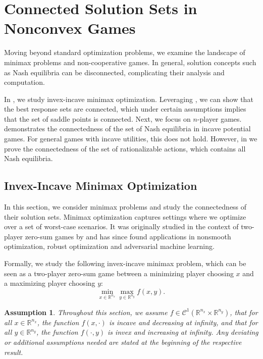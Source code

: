 \documentclass{article}
\newtheorem{assum}{Assumption}
\newcommand{\R}{\mathbb{R}}
\begin{document}
\section{Connected Solution Sets in Nonconvex Games}
\label{sec:connected_equilibria}





Moving beyond standard optimization problems, we examine the landscape of minimax problems and non-cooperative games. In general, solution concepts such as Nash equilibria can be disconnected, complicating their analysis and computation.


In , we study invex-incave minimax optimization. Leveraging , we can show that the best response sets are connected, which under certain assumptions implies that the set of saddle points is connected. Next, we focus on $n$-player games.  demonstrates the connectedness of the set of Nash equilibria in incave potential games. For general games with incave utilities, this does not hold. However, in  we prove the connectedness of the set of rationalizable actions, which contains all Nash equilibria. 



\subsection{Invex-Incave Minimax Optimization}
\label{sec:zero_sum_games}

In this section, we consider minimax problems and study the connectedness of their solution sets. Minimax optimization captures settings where we optimize over a set of worst-case scenarios. It was originally studied in the context of two-player zero-sum games by \citet{Neumann1928Zur} and has since found applications in nonsmooth optimization, robust optimization and adversarial machine learning. 

Formally, we study the following invex-incave minimax problem, which can be seen as a two-player zero-sum game between a minimizing player choosing $x$ and a maximizing player choosing $y$:
\begin{equation}
    \label{eq:minimax_problem}
    \min_{x\in \R^{n_x}} \max_{y\in \R^{n_y}} f(x,y).
\end{equation}

\begin{assum}
    \label{assum:minmaxinvex}
    Throughout this section, we assume $f \in \mathcal{C}^1(\R^{n_x} \times \R^{n_y})$, that for all $x \in \R^{n_x}$, the function $f(x,\cdot)$ is incave and decreasing at infinity, and that for all $y \in \R^{n_y}$, the function $f(\cdot,y)$ is invex and increasing at infinity. Any deviating or additional assumptions needed are stated at the beginning of the respective result.
\end{assum}
\end{document}
